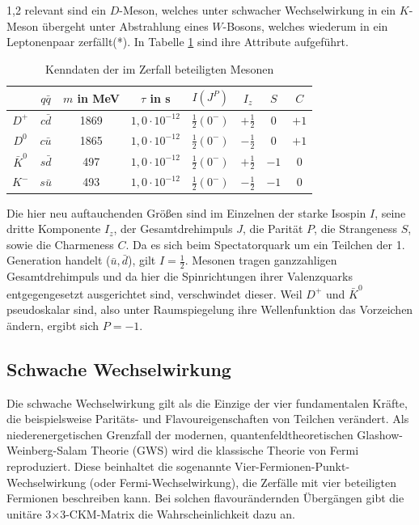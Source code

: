 \documentclass[11pt,a4paper,twoside,draft]{report}
\begin{document}
\begin{spacing}{1,2}
relevant sind ein $D$-Meson, welches unter schwacher Wechselwirkung in ein $K$-Meson übergeht unter Abstrahlung eines $W$-Bosons, welches wiederum in ein 
Leptonenpaar zerfällt(*). In Tabelle \ref{tab_DKMeson} sind ihre Attribute \cite{PDG} aufgeführt.
\begin{table}[H]
\begin{tabular}{c|ccc|cccc} \toprule 
  & $q\bar q$ &  $m$ in MeV & $\tau$ in s & $I(J^P)$ & $I_z$ & $S$ & $C$\\
 \midrule
  $D^+$ & $c\bar d$ & 1869 & $1,0\cdot10^{-12}$ & $\frac12(0^-)$ & $+\frac12$ & 0 & $+1$\\
  $D^0$ & $c\bar u$ & 1865 & $1,0\cdot10^{-12}$  & $\frac12(0^-)$ & $-\frac12$ & 0 & $+1$\\
  $\bar K^0$ & $s\bar d$ & 497 & $1,0\cdot10^{-12}$ & $\frac12(0^-)$ & $+\frac12$ & $-1$& 0\\
  $K^-$ & $s\bar u $ & 493 & $1,0\cdot10^{-12}$ & $\frac12(0^-)$ & $-\frac12$ & $-1$ & 0
\\\bottomrule \bottomrule
 \end{tabular}
\caption{Kenndaten der im Zerfall beteiligten Mesonen}
\label{tab_DKMeson}
\end{table}
\noindent
Die hier neu auftauchenden Größen sind im Einzelnen der starke Isospin $I$, seine dritte Komponente $I_z$, der Gesamtdrehimpuls $J$, die Parität $P$, die
Strangeness $S$, sowie die Charmeness $C$. Da es sich beim Spectatorquark um ein Teilchen der 1. Generation handelt ($\bar u, \bar d$), gilt $I = \frac12$. 
Mesonen tragen ganzzahligen Gesamtdrehimpuls und da hier die Spinrichtungen ihrer Valenzquarks entgegengesetzt 
ausgerichtet sind, verschwindet dieser. Weil $D^+$ und $\bar K^0$ pseudoskalar sind, also unter Raumspiegelung ihre Wellenfunktion das Vorzeichen ändern, 
ergibt sich $P=-1$.

\subsection{Schwache Wechselwirkung}
\label{sec_schwacheWW}
Die schwache Wechselwirkung gilt als die Einzige der vier fundamentalen Kräfte, die beispielsweise Paritäts- und Flavoureigenschaften von Teilchen verändert.
Als niederenergetischen Grenzfall der modernen, quantenfeldtheoretischen Glashow-Weinberg-Salam Theorie (GWS) wird die klassische Theorie von Fermi 
reproduziert. Diese beinhaltet die
sogenannte Vier-Fermionen-Punkt-Wechselwirkung (oder Fermi-Wechselwirkung), die Zerfälle mit vier beteiligten Fermionen beschreiben kann. Bei solchen
flavourändernden Übergängen gibt die unitäre 3$\times$3-CKM-Matrix die Wahrscheinlichkeit dazu an. 


\end{spacing}
\end{document}
